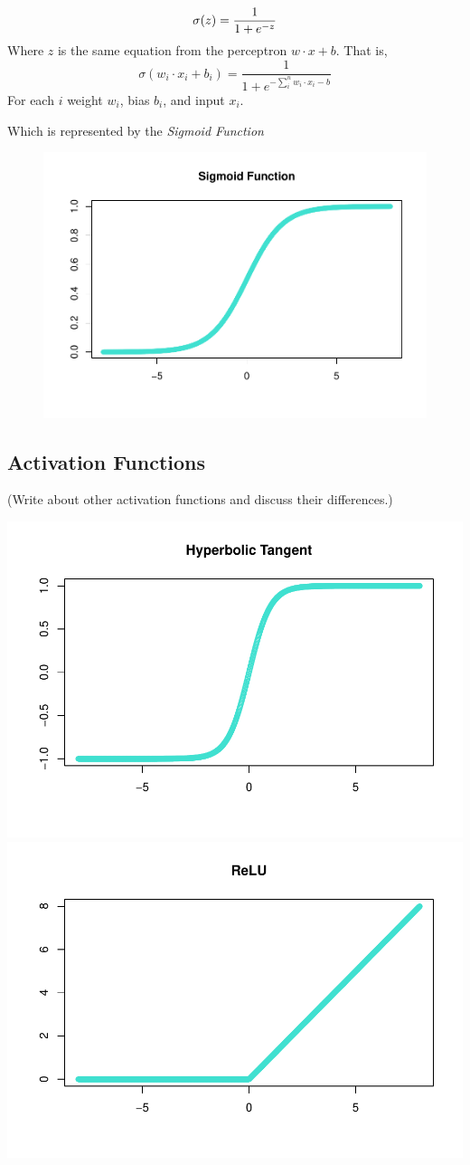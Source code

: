 \[
\sigma(z) = \frac{1}{1+e^{-z}} \\
\] Where \(z\) is the same equation from the perceptron
\(w \cdot x + b\). That is, \[
\sigma(w_i \cdot x_i + b_i) = \frac{1}{1+e^{-\sum_i^n w_i \cdot x_i - b}}
\] For each \(i\) weight \(w_i\), bias \(b_i\), and input \(x_i\).

Which is represented by the \emph{Sigmoid Function}

\begin{figure}
    \centering
    \includegraphics[width = .7\textwidth]{Figures/sigmoid-function-1.pdf}
\end{figure}


\hypertarget{activation-functions}{%
\subsection{Activation Functions}\label{activation-functions}}

(Write about other activation functions and discuss their differences.)

\includegraphics[width=0.5\linewidth]{Figures/other-activation-functions-1.pdf}
\includegraphics[width=0.5\linewidth]{Figures/other-activation-functions-2.pdf}

